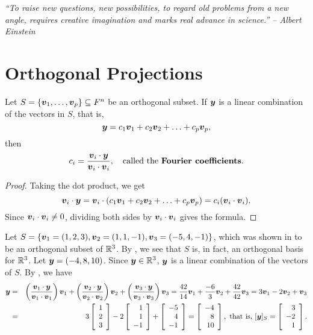 \begin{center} 
\emph{``To raise new questions, new possibilities, to regard old problems from a new angle, requires creative imagination and marks real advance in science.'' --  Albert Einstein}
\end{center}

\section{Orthogonal Projections}\label{sec:orthoproj}
\begin{Thm}\label{5} Let  $S= \{\boldsymbol v_1, \ldots, \boldsymbol v_p\} \subseteq F^n$ be an orthogonal subset. If $\boldsymbol y$ is a linear combination of the vectors in $S$, that is, 
\[\boldsymbol y = c_1\boldsymbol v_1 + c_2\boldsymbol v_2 + \ldots + c_p\boldsymbol v_p,\] then \[c_i = \dfrac{\boldsymbol v_i \cdot \boldsymbol y}{\boldsymbol v_i \cdot \boldsymbol v_i},\quad\text{called the \textbf{Fourier coefficients}.}\]
\end{Thm}
\begin{proof}
Taking the dot product, we get 
\[\boldsymbol v_i\cdot \boldsymbol y = \boldsymbol v_i \cdot (c_1\boldsymbol v_1 + c_2\boldsymbol v_2 + \ldots + c_p\boldsymbol v_p) = c_i(\boldsymbol v_i \cdot \boldsymbol v_i).\] Since $\boldsymbol v_i\cdot \boldsymbol v_i\neq 0$, dividing both sides by $\boldsymbol v_i\cdot \boldsymbol v_i$ gives the formula.
\end{proof}\vs

\begin{Exam} Let $S = \left\{\boldsymbol v_1 = (1,2,3), \boldsymbol v_2 = (1,1,-1), \boldsymbol v_3 = (-5,4,-1)\right\}$, which was shown in  to be an orthogonal subset of $\mathbb{R}^3$. By , we see that $S$ is, in fact, an orthogonal basis for $\mathbb{R}^3$. Let $\boldsymbol y = (-4,8,10)$. Since $\boldsymbol y \in \mathbb{R}^3$, $\boldsymbol y$ is a linear combination of the vectors of $S$. By , we have 
\begin{eqnarray*}
\boldsymbol y &=& \left(\dfrac{\boldsymbol v_1 \cdot \boldsymbol y}{\boldsymbol v_1 \cdot \boldsymbol v_1}\right)\boldsymbol v_1 + \left(\dfrac{\boldsymbol v_2 \cdot \boldsymbol y}{\boldsymbol v_2 \cdot \boldsymbol v_2}\right)\boldsymbol v_2 + \left(\dfrac{\boldsymbol v_3 \cdot \boldsymbol y}{\boldsymbol v_3 \cdot \boldsymbol v_3}\right)\boldsymbol v_3 = \dfrac{42}{14}\boldsymbol v_1 + \dfrac{-6}{3}\boldsymbol v_2 + \dfrac{42}{42}\boldsymbol v_3 = 3\boldsymbol v_1 - 2\boldsymbol v_2 + \boldsymbol v_3 \\
&=& 3\left[\begin{array}{r} 1\\2\\3 \end{array}\right] - 2\left[\begin{array}{r} 1\\1\\-1 \end{array}\right] + \left[\begin{array}{r} -5\\4\\-1 \end{array}\right] = \left[\begin{array}{r} -4\\8\\10 \end{array}\right], \text{ that is, } [\boldsymbol y]_S = \left[\begin{array}{r} 3\\-2\\1 \end{array}\right].
\end{eqnarray*}
\end{Exam}


